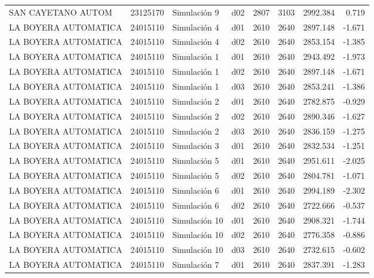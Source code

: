 \begin{landscape}
\begin{longtable}{lrlp{2cm}p{2cm}p{3cm}p{2cm}r}
      SAN CAYETANO AUTOM &  23125170 &   Simulación 9 &   d02 &      2807 &     3103 &  2992.384 &     0.719 \\
    LA BOYERA AUTOMATICA &  24015110 &   Simulación 4 &   d01 &      2610 &     2640 &  2897.148 &    -1.671 \\
    LA BOYERA AUTOMATICA &  24015110 &   Simulación 4 &   d02 &      2610 &     2640 &  2853.154 &    -1.385 \\
    LA BOYERA AUTOMATICA &  24015110 &   Simulación 1 &   d01 &      2610 &     2640 &  2943.492 &    -1.973 \\
    LA BOYERA AUTOMATICA &  24015110 &   Simulación 1 &   d02 &      2610 &     2640 &  2897.148 &    -1.671 \\
    LA BOYERA AUTOMATICA &  24015110 &   Simulación 1 &   d03 &      2610 &     2640 &  2853.241 &    -1.386 \\
    LA BOYERA AUTOMATICA &  24015110 &   Simulación 2 &   d01 &      2610 &     2640 &  2782.875 &    -0.929 \\
    LA BOYERA AUTOMATICA &  24015110 &   Simulación 2 &   d02 &      2610 &     2640 &  2890.346 &    -1.627 \\
    LA BOYERA AUTOMATICA &  24015110 &   Simulación 2 &   d03 &      2610 &     2640 &  2836.159 &    -1.275 \\
    LA BOYERA AUTOMATICA &  24015110 &   Simulación 3 &   d01 &      2610 &     2640 &  2832.534 &    -1.251 \\
    LA BOYERA AUTOMATICA &  24015110 &   Simulación 5 &   d01 &      2610 &     2640 &  2951.611 &    -2.025 \\
    LA BOYERA AUTOMATICA &  24015110 &   Simulación 5 &   d02 &      2610 &     2640 &  2804.781 &    -1.071 \\
    LA BOYERA AUTOMATICA &  24015110 &   Simulación 6 &   d01 &      2610 &     2640 &  2994.189 &    -2.302 \\
    LA BOYERA AUTOMATICA &  24015110 &   Simulación 6 &   d02 &      2610 &     2640 &  2722.666 &    -0.537 \\
    LA BOYERA AUTOMATICA &  24015110 &  Simulación 10 &   d01 &      2610 &     2640 &  2908.321 &    -1.744 \\
    LA BOYERA AUTOMATICA &  24015110 &  Simulación 10 &   d02 &      2610 &     2640 &  2776.358 &    -0.886 \\
    LA BOYERA AUTOMATICA &  24015110 &  Simulación 10 &   d03 &      2610 &     2640 &  2732.615 &    -0.602 \\
    LA BOYERA AUTOMATICA &  24015110 &   Simulación 7 &   d01 &      2610 &     2640 &  2837.391 &    -1.283 \\

\end{longtable}
\end{landscape}
